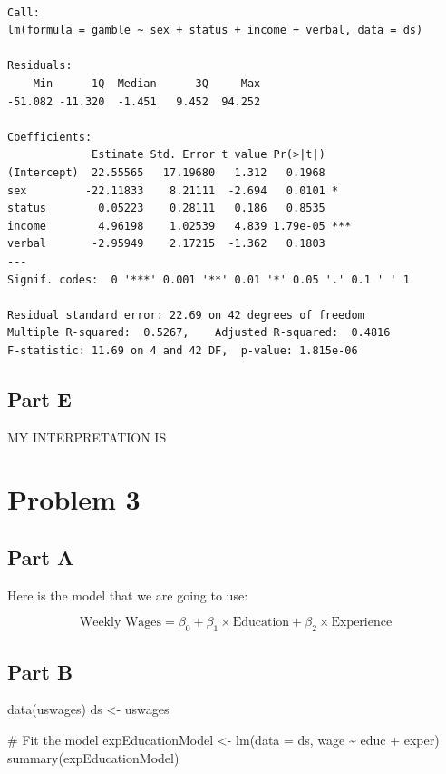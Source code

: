 \documentclass[
  letterpaper,
  DIV=11,
  numbers=noendperiod]{scrartcl}
\newenvironment{Shaded}{}{}
\newcommand{\AttributeTok}[1]{\textcolor[rgb]{0.84,0.60,0.13}{#1}}
\newcommand{\CommentTok}[1]{\textcolor[rgb]{0.57,0.51,0.45}{#1}}
\newcommand{\FunctionTok}[1]{\textcolor[rgb]{0.41,0.62,0.42}{#1}}
\newcommand{\NormalTok}[1]{\textcolor[rgb]{0.24,0.22,0.21}{#1}}
\newcommand{\OtherTok}[1]{\textcolor[rgb]{0.41,0.62,0.42}{#1}}
\newcommand{\SpecialCharTok}[1]{\textcolor[rgb]{0.69,0.38,0.53}{#1}}
\begin{document}
\begin{verbatim}

Call:
lm(formula = gamble ~ sex + status + income + verbal, data = ds)

Residuals:
    Min      1Q  Median      3Q     Max 
-51.082 -11.320  -1.451   9.452  94.252 

Coefficients:
             Estimate Std. Error t value Pr(>|t|)    
(Intercept)  22.55565   17.19680   1.312   0.1968    
sex         -22.11833    8.21111  -2.694   0.0101 *  
status        0.05223    0.28111   0.186   0.8535    
income        4.96198    1.02539   4.839 1.79e-05 ***
verbal       -2.95949    2.17215  -1.362   0.1803    
---
Signif. codes:  0 '***' 0.001 '**' 0.01 '*' 0.05 '.' 0.1 ' ' 1

Residual standard error: 22.69 on 42 degrees of freedom
Multiple R-squared:  0.5267,    Adjusted R-squared:  0.4816 
F-statistic: 11.69 on 4 and 42 DF,  p-value: 1.815e-06
\end{verbatim}

\hypertarget{part-e}{%
\subsection{Part E}\label{part-e}}

MY INTERPRETATION IS

\newpage{}

\hypertarget{problem-3}{%
\section{Problem 3}\label{problem-3}}

\hypertarget{part-a-2}{%
\subsection{Part A}\label{part-a-2}}

Here is the model that we are going to use:

\[\text{Weekly Wages} = \beta_0 + \beta_1 \times \text{Education} + \beta_2 \times \text{Experience}\]

\newpage{}

\hypertarget{part-b-2}{%
\subsection{Part B}\label{part-b-2}}

\begin{Shaded}
\begin{Highlighting}[]
\FunctionTok{data}\NormalTok{(uswages)}
\NormalTok{ds }\OtherTok{\textless{}{-}}\NormalTok{ uswages}

\CommentTok{\# Fit the model}
\NormalTok{expEducationModel }\OtherTok{\textless{}{-}} \FunctionTok{lm}\NormalTok{(}\AttributeTok{data =}\NormalTok{ ds, wage }\SpecialCharTok{\textasciitilde{}}\NormalTok{ educ }\SpecialCharTok{+}\NormalTok{ exper)}
\FunctionTok{summary}\NormalTok{(expEducationModel)}
\end{Highlighting}
\end{Shaded}
\end{document}
